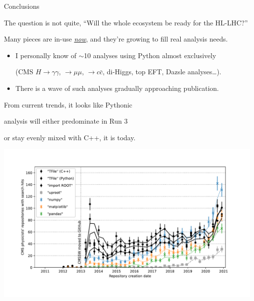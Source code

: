 \documentclass[aspectratio=169]{beamer}
\begin{document}
\begin{frame}{Conclusions}
\vspace{0.5 cm}
\large

The question is not quite, ``Will the whole ecosystem be ready for the HL-LHC?''

\vspace{0.25 cm}
Many pieces are in-use \underline{\it now}, and they're growing to fill real analysis needs.

\vspace{0.25 cm}
\begin{itemize}\setlength{\itemsep}{0.25 cm}
\item I personally know of $\sim$10 analyses using Python almost exclusively

(CMS $H \to \gamma\gamma$, $\to \mu\mu$, $\to c\bar{c}$, di-Higgs, top EFT, Dazsle analyses\ldots).

\item There is a wave of such analyses gradually approaching publication.
\end{itemize}

\vspace{0.6 cm}
From current trends, it looks like Pythonic

analysis will either predominate in Run 3

or stay evenly mixed with C++, it is today.

\vspace{-2.5 cm}
\hfill \mbox{\includegraphics[width=0.55\linewidth]{lhlhc-github-overlay-lin.pdf}\hspace{-1 cm}}

\vspace{-0.5 cm}
\end{frame}
\end{document}
